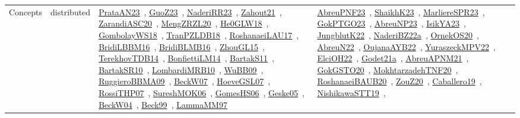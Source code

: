{\begin{longtable}{lp{3cm}>{\raggedright\arraybackslash}p{6cm}>{\raggedright\arraybackslash}p{6cm}>{\raggedright\arraybackslash}p{8cm}}
Concepts & distributed & \href{../works/PrataAN23.pdf}{PrataAN23}~\cite{PrataAN23}, \href{../works/GuoZ23.pdf}{GuoZ23}~\cite{GuoZ23}, \href{../works/NaderiRR23.pdf}{NaderiRR23}~\cite{NaderiRR23}, \href{../works/Zahout21.pdf}{Zahout21}~\cite{Zahout21}, \href{../works/ZarandiASC20.pdf}{ZarandiASC20}~\cite{ZarandiASC20}, \href{../works/MengZRZL20.pdf}{MengZRZL20}~\cite{MengZRZL20}, \href{../works/He0GLW18.pdf}{He0GLW18}~\cite{He0GLW18}, \href{../works/GombolayWS18.pdf}{GombolayWS18}~\cite{GombolayWS18}, \href{../works/TranPZLDB18.pdf}{TranPZLDB18}~\cite{TranPZLDB18}, \href{../works/RoshanaeiLAU17.pdf}{RoshanaeiLAU17}~\cite{RoshanaeiLAU17}, \href{../works/BridiLBBM16.pdf}{BridiLBBM16}~\cite{BridiLBBM16}, \href{../works/BridiBLMB16.pdf}{BridiBLMB16}~\cite{BridiBLMB16}, \href{../works/ZhouGL15.pdf}{ZhouGL15}~\cite{ZhouGL15}, \href{../works/TerekhovTDB14.pdf}{TerekhovTDB14}~\cite{TerekhovTDB14}, \href{../works/BonfiettiLM14.pdf}{BonfiettiLM14}~\cite{BonfiettiLM14}, \href{../works/BartakS11.pdf}{BartakS11}~\cite{BartakS11}, \href{../works/BartakSR10.pdf}{BartakSR10}~\cite{BartakSR10}, \href{../works/LombardiMRB10.pdf}{LombardiMRB10}~\cite{LombardiMRB10}, \href{../works/WuBB09.pdf}{WuBB09}~\cite{WuBB09}, \href{../works/RuggieroBBMA09.pdf}{RuggieroBBMA09}~\cite{RuggieroBBMA09}, \href{../works/BeckW07.pdf}{BeckW07}~\cite{BeckW07}, \href{../works/HoeveGSL07.pdf}{HoeveGSL07}~\cite{HoeveGSL07}, \href{../works/RossiTHP07.pdf}{RossiTHP07}~\cite{RossiTHP07}, \href{../works/SureshMOK06.pdf}{SureshMOK06}~\cite{SureshMOK06}, \href{../works/GomesHS06.pdf}{GomesHS06}~\cite{GomesHS06}, \href{../works/Geske05.pdf}{Geske05}~\cite{Geske05}, \href{../works/BeckW04.pdf}{BeckW04}~\cite{BeckW04}, \href{../works/Beck99.pdf}{Beck99}~\cite{Beck99}, \href{../works/LammaMM97.pdf}{LammaMM97}~\cite{LammaMM97} & \href{../works/AbreuPNF23.pdf}{AbreuPNF23}~\cite{AbreuPNF23}, \href{../works/ShaikhK23.pdf}{ShaikhK23}~\cite{ShaikhK23}, \href{../works/MarliereSPR23.pdf}{MarliereSPR23}~\cite{MarliereSPR23}, \href{../works/GokPTGO23.pdf}{GokPTGO23}~\cite{GokPTGO23}, \href{../works/AbreuNP23.pdf}{AbreuNP23}~\cite{AbreuNP23}, \href{../works/IsikYA23.pdf}{IsikYA23}~\cite{IsikYA23}, \href{../works/JungblutK22.pdf}{JungblutK22}~\cite{JungblutK22}, \href{../works/NaderiBZ22a.pdf}{NaderiBZ22a}~\cite{NaderiBZ22a}, \href{../works/OrnekOS20.pdf}{OrnekOS20}~\cite{OrnekOS20}, \href{../works/AbreuN22.pdf}{AbreuN22}~\cite{AbreuN22}, \href{../works/OujanaAYB22.pdf}{OujanaAYB22}~\cite{OujanaAYB22}, \href{../works/YuraszeckMPV22.pdf}{YuraszeckMPV22}~\cite{YuraszeckMPV22}, \href{../works/ElciOH22.pdf}{ElciOH22}~\cite{ElciOH22}, \href{../works/Godet21a.pdf}{Godet21a}~\cite{Godet21a}, \href{../works/AbreuAPNM21.pdf}{AbreuAPNM21}~\cite{AbreuAPNM21}, \href{../works/GokGSTO20.pdf}{GokGSTO20}~\cite{GokGSTO20}, \href{../works/MokhtarzadehTNF20.pdf}{MokhtarzadehTNF20}~\cite{MokhtarzadehTNF20}, \href{../works/RoshanaeiBAUB20.pdf}{RoshanaeiBAUB20}~\cite{RoshanaeiBAUB20}, \href{../works/ZouZ20.pdf}{ZouZ20}~\cite{ZouZ20}, \href{../works/Caballero19.pdf}{Caballero19}~\cite{Caballero19}, \href{../works/NishikawaSTT19.pdf}{NishikawaSTT19}~\cite{NishikawaSTT19}, 
\end{longtable}}
